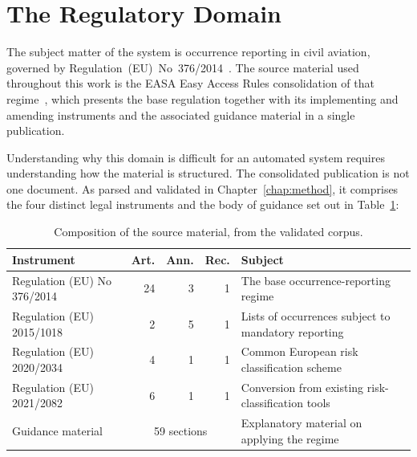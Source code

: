 
\section{The Regulatory Domain}
\label{sec:context-domain}

The subject matter of the system is occurrence reporting in civil aviation, governed by Regulation~(EU)~No~376/2014~\cite{eu2014reg376}. The source material used throughout this work is the \ac{EASA} Easy Access Rules consolidation of that regime~\cite{easa2022easyaccess376}, which presents the base regulation together with its implementing and amending instruments and the associated guidance material in a single publication.

Understanding why this domain is difficult for an automated system requires understanding how the material is structured. The consolidated publication is not one document. As parsed and validated in Chapter~\ref{chap:method}, it comprises the four distinct legal instruments and the body of guidance set out in Table~\ref{tab:context-sources}:

\begin{table}[htbp]
  \centering
  \caption{Composition of the source material, from the validated corpus.}
  \label{tab:context-sources}
  \small
  \begin{tabularx}{\textwidth}{@{}l r r r X@{}}
    \toprule
    \textbf{Instrument} & \textbf{Art.} & \textbf{Ann.} & \textbf{Rec.} & \textbf{Subject} \\
    \midrule
    Regulation (EU) No 376/2014 & 24 & 3 & 1 & The base occurrence-reporting regime \\
    Regulation (EU) 2015/1018 & 2 & 5 & 1 & Lists of occurrences subject to mandatory reporting \\
    Regulation (EU) 2020/2034 & 4 & 1 & 1 & Common European risk classification scheme \\
    Regulation (EU) 2021/2082 & 6 & 1 & 1 & Conversion from existing risk-classification tools \\
    \midrule
    Guidance material & \multicolumn{3}{c}{59 sections} & Explanatory material on applying the regime \\
    \bottomrule
  \end{tabularx}
\end{table}

